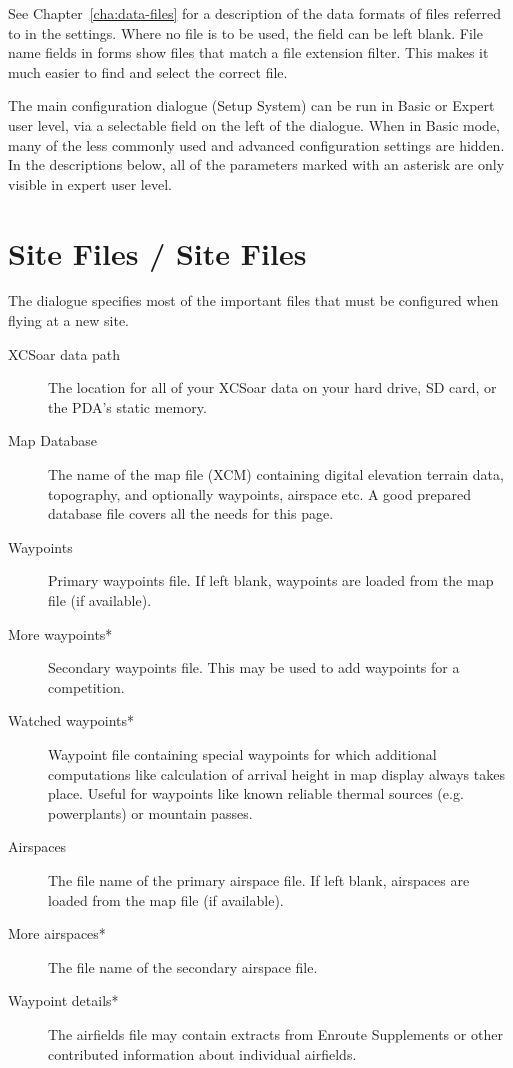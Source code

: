 See Chapter~\ref{cha:data-files} for a description of the data formats
of files referred to in the settings.  Where no file is to be used,
the field can be left blank.  File name fields in forms show files
that match a file extension filter.  This makes it much easier to find
and select the correct file.

The main configuration dialogue (Setup System) can be run in Basic or
Expert user level, via a selectable field on the left of the dialogue.
When in Basic mode, many of the less commonly used and advanced
configuration settings are hidden.  In the descriptions below,
all of the parameters marked with an asterisk are only visible in
expert user level. 

\section{Site Files / Site Files}
The dialogue specifies most of the important files that must be
configured when flying at a new site.

\begin{description}
\item[XCSoar data path]  The location for all of your XCSoar data on your hard drive, 
  SD card, or the PDA's static memory.
\item[Map Database]  The name of the map file (XCM) containing digital elevation
  terrain data, topography, and optionally waypoints, airspace etc. A good
  prepared database file covers all the needs for this page.
\item[Waypoints]  Primary waypoints file.  If left blank, waypoints are loaded
  from the map file (if available).
\item[More waypoints*]  Secondary waypoints file.  This may be used to add 
  waypoints for a competition.
\item[Watched waypoints*]  Waypoint file containing special waypoints for 
  which additional computations   like calculation of arrival height in map 
  display always takes place. Useful for waypoints   like known reliable 
  thermal sources (e.g. powerplants) or mountain passes.
\item[Airspaces]  The file name of the primary airspace file.  If left blank,
  airspaces are loaded from the map file (if available).
\item[More airspaces*]  The file name of the secondary airspace file.
\item[Waypoint details*]  The airfields file may contain extracts from 
  Enroute Supplements or other contributed information about individual airfields.
\end{description}

